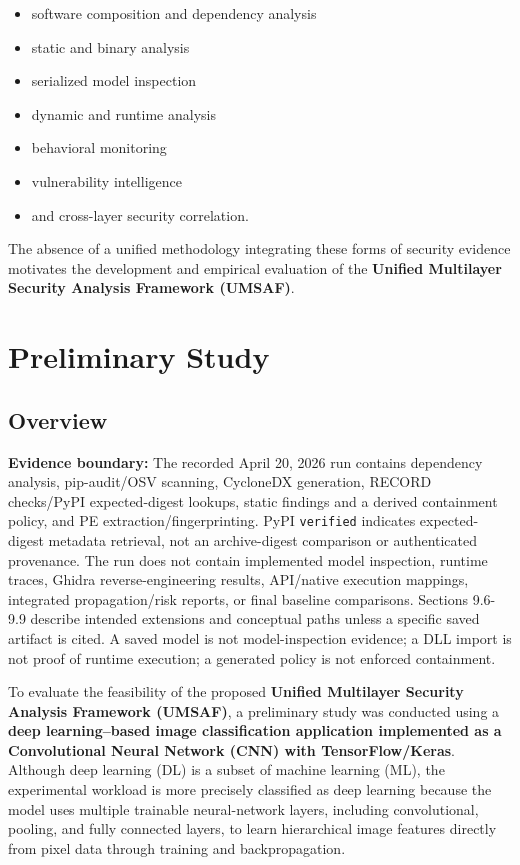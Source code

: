 \documentclass[
  12pt,
  letterpaper,
  oneside]{report}
\providecommand{\tightlist}{%
  \setlength{\itemsep}{0pt}\setlength{\parskip}{0pt}}
\begin{document}
\begin{itemize}
\tightlist
\item
  software composition and dependency analysis
\item
  static and binary analysis
\item
  serialized model inspection
\item
  dynamic and runtime analysis
\item
  behavioral monitoring
\item
  vulnerability intelligence
\item
  and cross-layer security correlation.
\end{itemize}

The absence of a unified methodology integrating these forms of security
evidence motivates the development and empirical evaluation of the
\textbf{Unified Multilayer Security Analysis Framework (UMSAF)}.

\chapter{Preliminary Study}\label{9-preliminary-study}

\section{Overview}\label{91-overview}

\textbf{Evidence boundary:} The recorded April 20, 2026 run contains
dependency analysis, pip-audit/OSV scanning, CycloneDX generation,
RECORD checks/PyPI expected-digest lookups, static findings and a
derived containment policy, and PE extraction/fingerprinting. PyPI
\texttt{verified} indicates expected-digest metadata retrieval, not an
archive-digest comparison or authenticated provenance. The run does not
contain implemented model inspection, runtime traces, Ghidra
reverse-engineering results, API/native execution mappings, integrated
propagation/risk reports, or final baseline comparisons. Sections
9.6-9.9 describe intended extensions and conceptual paths unless a
specific saved artifact is cited. A saved model is not model-inspection
evidence; a DLL import is not proof of runtime execution; a generated
policy is not enforced containment.

To evaluate the feasibility of the proposed \textbf{Unified Multilayer
Security Analysis Framework (UMSAF)}, a preliminary study was conducted
using a \textbf{deep learning--based image classification application
implemented as a Convolutional Neural Network (CNN) with
TensorFlow/Keras}. Although deep learning (DL) is a subset of machine
learning (ML), the experimental workload is more precisely classified as
deep learning because the model uses multiple trainable neural-network
layers, including convolutional, pooling, and fully connected layers, to
learn hierarchical image features directly from pixel data through
training and backpropagation.
\end{document}

